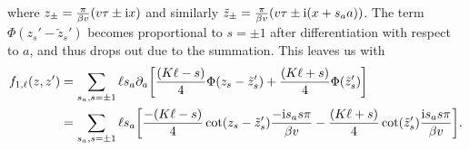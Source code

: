 where $z_\pm = \frac{\pi}{\beta v} (v\tau \pm \text{i} x)$ and similarly $\tilde{z}_\pm = \frac{\pi}{\beta v} (v\tau \pm \text{i} (x + s_aa))$.
The term $\Phi(z_s' - \tilde{z}_s')$ becomes proportional to $s=\pm 1$ after differentiation with respect to $a$, and thus drops out due to the summation.
This leaves us with
\begin{align*}
f_{1,\ell}(z,z') &= \sum_{s_a,s=\pm 1} \ell s_a\partial_a \klb*{\frac{(K\ell - s)}{4} \Phi(z_s - \tilde{z}_s') + \frac{(K\ell + s)}{4} \Phi(\tilde{z}_s')}\\
&= \sum_{s_a,s=\pm 1} \ell s_a\klb*{\frac{-(K\ell - s)}{4} \cot(z_s - \tilde{z}_s') \frac{-\i s_a s\pi}{\beta v} - \frac{(K\ell + s)}{4} \cot(\tilde{z}_s') \frac{\i s_a s\pi}{\beta v}}.
\end{align*}
